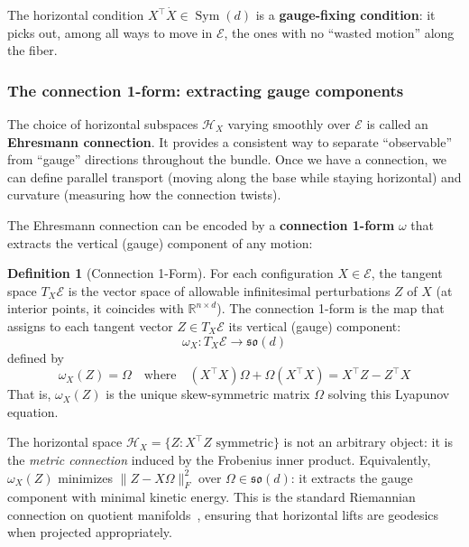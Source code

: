\documentclass{article}
\newcommand{\RR}{\mathbb{R}}
\newcommand{\so}{\mathfrak{so}}
\DeclareMathOperator{\Sym}{Sym}
\theoremstyle{plain}
\theoremstyle{definition}
\newtheorem{definition}{Definition}
\theoremstyle{remark}
\begin{document}
The horizontal condition $X^\top \dot{X} \in \Sym(d)$ is a \textbf{gauge-fixing condition}: it picks out, among all ways to move in $\mathcal{E}$, the ones with no ``wasted motion'' along the fiber.


\subsubsection{The connection 1-form: extracting gauge components}

The choice of horizontal subspaces $\mathcal{H}_X$ varying smoothly over $\mathcal{E}$ is called an \textbf{Ehresmann connection}.
It provides a consistent way to separate ``observable'' from ``gauge'' directions throughout the bundle.
Once we have a connection, we can define parallel transport (moving along the base while staying horizontal) and curvature (measuring how the connection twists).

The Ehresmann connection can be encoded by a \textbf{connection 1-form} $\omega$ that extracts the vertical (gauge) component of any motion:

\begin{definition}[Connection 1-Form]
For each configuration $X \in \mathcal{E}$, the tangent space $T_X \mathcal{E}$ is the vector space of allowable infinitesimal perturbations $Z$ of $X$ (at interior points, it coincides with $\RR^{n \times d}$).
The connection 1-form is the map that assigns to each tangent vector $Z \in T_X \mathcal{E}$ its vertical (gauge) component:
\begin{equation}
\omega_X: T_X \mathcal{E} \to \so(d)
\end{equation}
defined by
\begin{equation}
\omega_X(Z) = \Omega \quad \text{where} \quad (X^\top X) \Omega + \Omega (X^\top X) = X^\top Z - Z^\top X
\end{equation}
That is, $\omega_X(Z)$ is the unique skew-symmetric matrix $\Omega$ solving this Lyapunov equation.
\end{definition}

The horizontal space $\mathcal{H}_X = \{Z : X^\top Z \text{ symmetric}\}$ is not an arbitrary object: it is the \emph{metric connection} induced by the Frobenius inner product.
Equivalently, $\omega_X(Z)$ minimizes $\|Z - X\Omega\|_F^2$ over $\Omega \in \so(d)$: it extracts the gauge component with minimal kinetic energy.
This is the standard Riemannian connection on quotient manifolds~\citep{absil2008optimization,massart2020quotient}, ensuring that horizontal lifts are geodesics when projected appropriately.
\end{document}
